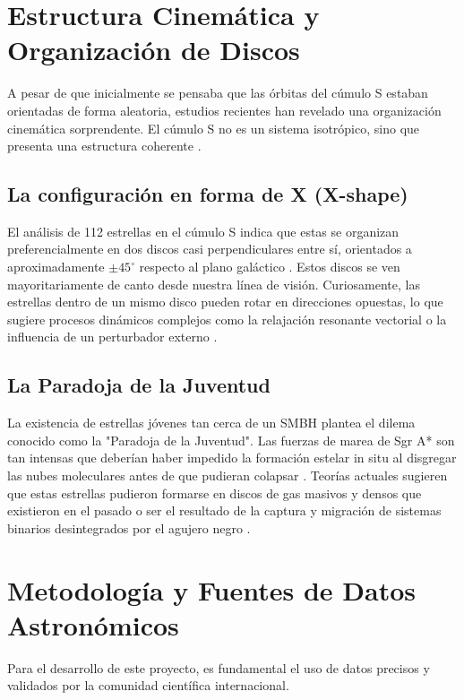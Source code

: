 \documentclass[a4paper]{article}
\begin{document}
\section{Estructura Cinemática y Organización de Discos}

A pesar de que inicialmente se pensaba que las órbitas del cúmulo S estaban orientadas de forma aleatoria, estudios recientes han revelado una organización cinemática sorprendente. El cúmulo S no es un sistema isotrópico, sino que presenta una estructura coherente \cite{ali2020kinematic}.

\subsection{La configuración en forma de X (X-shape)}
El análisis de 112 estrellas en el cúmulo S indica que estas se organizan preferencialmente en dos discos casi perpendiculares entre sí, orientados a aproximadamente $\pm 45^\circ$ respecto al plano galáctico \cite{ali2020kinematic}. Estos discos se ven mayoritariamente de canto desde nuestra línea de visión. Curiosamente, las estrellas dentro de un mismo disco pueden rotar en direcciones opuestas, lo que sugiere procesos dinámicos complejos como la relajación resonante vectorial o la influencia de un perturbador externo \cite{ali2020kinematic}.

\subsection{La Paradoja de la Juventud}
La existencia de estrellas jóvenes tan cerca de un SMBH plantea el dilema conocido como la "Paradoja de la Juventud". Las fuerzas de marea de Sgr A* son tan intensas que deberían haber impedido la formación estelar in situ al disgregar las nubes moleculares antes de que pudieran colapsar \cite{ciurlo2025sagittarius}. Teorías actuales sugieren que estas estrellas pudieron formarse en discos de gas masivos y densos que existieron en el pasado o ser el resultado de la captura y migración de sistemas binarios desintegrados por el agujero negro \cite{ciurlo2025sagittarius, ali2020kinematic}.

\section{Metodología y Fuentes de Datos Astronómicos}

Para el desarrollo de este proyecto, es fundamental el uso de datos precisos y validados por la comunidad científica internacional.
\end{document}
